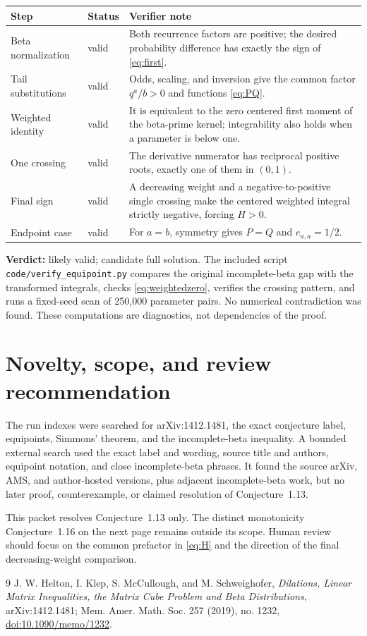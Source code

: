 \documentclass[11pt]{article}
\begin{document}
\begin{center}
\begin{tabular}{p{}p{}p{}}
\textbf{Step} & \textbf{Status} & \textbf{Verifier note}\\ \hline
Beta normalization & valid & Both recurrence factors are positive; the desired probability difference has exactly the sign of \eqref{eq:first}.\\
Tail substitutions & valid & Odds, scaling, and inversion give the common factor $q^a/b>0$ and functions \eqref{eq:PQ}.\\
Weighted identity & valid & It is equivalent to the zero centered first moment of the beta-prime kernel; integrability also holds when a parameter is below one.\\
One crossing & valid & The derivative numerator has reciprocal positive roots, exactly one of them in $(0,1)$.\\
Final sign & valid & A decreasing weight and a negative-to-positive single crossing make the centered weighted integral strictly negative, forcing $H>0$.\\
Endpoint case & valid & For $a=b$, symmetry gives $P=Q$ and $e_{a,a}=1/2$.\\
\end{tabular}
\end{center}

\noindent\textbf{Verdict:} likely valid; candidate full solution. The included
script \texttt{code/verify\_equipoint.py} compares the original incomplete-beta
gap with the transformed integrals, checks \eqref{eq:weightedzero}, verifies
the crossing pattern, and runs a fixed-seed scan of 250,000 parameter pairs.
No numerical contradiction was found. These computations are diagnostics,
not dependencies of the proof.

\section{Novelty, scope, and review recommendation}

The run indexes were searched for arXiv:1412.1481, the exact conjecture label,
equipoints, Simmons' theorem, and the incomplete-beta inequality. A bounded
external search used the exact label and wording, source title and authors,
equipoint notation, and close incomplete-beta phrases. It found the source
arXiv, AMS, and author-hosted versions, plus adjacent incomplete-beta work,
but no later proof, counterexample, or claimed resolution of Conjecture~1.13.

This packet resolves Conjecture~1.13 only. The distinct monotonicity
Conjecture~1.16 on the next page remains outside its scope. Human review should
focus on the common prefactor in \eqref{eq:H} and the direction of the final
decreasing-weight comparison.

\begin{thebibliography}{9}
J. W. Helton, I. Klep, S. McCullough, and M. Schweighofer,
\emph{Dilations, Linear Matrix Inequalities, the Matrix Cube Problem and Beta
Distributions}, arXiv:1412.1481; Mem. Amer. Math. Soc. 257 (2019), no. 1232,
\href{https://doi.org/10.1090/memo/1232}{doi:10.1090/memo/1232}.
\end{thebibliography}
\end{document}
